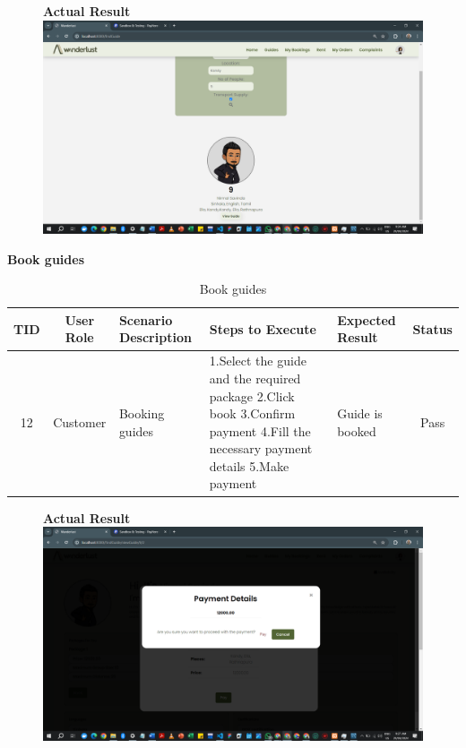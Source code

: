 \begin{figure}[h!]
    \centering
    \textbf{Actual Result}
    \includegraphics[width=1\textwidth]{Images/Test Cases/11. guide search.png}
\end{figure}
\clearpage


\textbf{Book guides}\\
\begin{table}[ht]
\centering
\begin{tabularx}{\textwidth}{|c|c|X|X|X|c|}
\hline
\textbf{TID} & \textbf{User Role} & \textbf{Scenario Description} & \textbf{Steps to Execute} & \textbf{Expected Result} & \textbf{Status} \\ \hline
12 & Customer & Booking guides & 1.Select the guide and the required package \newline2.Click book \newline3.Confirm payment \newline4.Fill the necessary payment details \newline5.Make payment & Guide is booked & Pass \\ \hline
\end{tabularx}
\caption{Book guides}
\end{table}

\begin{figure}[h!]
    \centering
    \textbf{Actual Result}
    \includegraphics[width=1\textwidth]{Images/Test Cases/12. book guide.png}
\end{figure}
\clearpage


